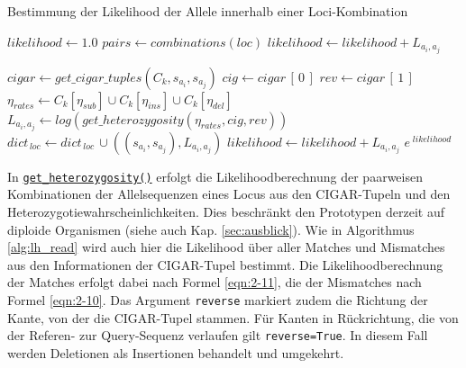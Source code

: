 \begin{algorithm}[H]
	\caption{Bestimmung der Likelihood der Allele innerhalb einer Loci-Kombination}  \label{alg:lh_loci}
	\begin{algorithmic}[1]	
		\State $ likelihood \gets 1.0 $
		    \State $ pairs \gets combinations(loc) $
		    \State $likelihood \gets likelihood + L_{a_{i}, a_{j}} $

		    \Else
		    
		    
		    
		    \State $cigar \gets get\_cigar\_tuples(C_{k}, s_{a_{i}}, s_{a_{j}})$  
			        \State $cig \gets cigar\,[\,0\,]$
			        \State $rev \gets cigar\,[\,1\,]$
			        \State $ \eta_{rates} \gets C_{k}[\eta_{sub}] \cup C_{k}[\eta_{ins}] \cup C_{k}[\eta_{del}]$
			        \State $L_{a_{i}, a_{j}} \gets log(get\_heterozygosity(\eta_{rates}, cig, rev))$  
			        \State $ dict_{\,loc} \gets dict_{\,loc} \, \cup ((s_{a_{i}}, s_{a_{j}}),  L_{a_{i}, a_{j}})  $
			    	\State $ likelihood \gets likelihood + L_{a_{i}, a_{j}}$    
			        \EndIf
			\EndIf
			\EndFor
		\EndFor
		\State \Return $ e^{\;likelihood} $
		\EndFunction
	\end{algorithmic}
\end{algorithm}

In \hyperref[schritt15]{\lstinline|get_heterozygosity()|\label{schritt15txt}} erfolgt die Likelihoodberechnung der paarweisen Kombinationen der Allelsequenzen eines Locus aus den CIGAR-Tupeln und den Heterozygotiewahrscheinlichkeiten. Dies beschränkt den Prototypen derzeit auf diploide Organismen (siehe auch Kap. \ref{sec:ausblick}). Wie in Algorithmus \ref{alg:lh_read} wird auch hier die Likelihood über aller Matches und Mismatches aus den Informationen der CIGAR-Tupel bestimmt. Die Likelihoodberechnung der Matches erfolgt dabei nach Formel \ref{eqn:2-11}, die der Mismatches nach Formel \ref{eqn:2-10}. Das Argument \lstinline|reverse| markiert zudem die Richtung der Kante, von der die CIGAR-Tupel stammen. Für  Kanten in Rückrichtung, die von der Referen- zur Query-Sequenz verlaufen gilt \lstinline|reverse=True|. In diesem Fall werden Deletionen als Insertionen behandelt und umgekehrt. \\

